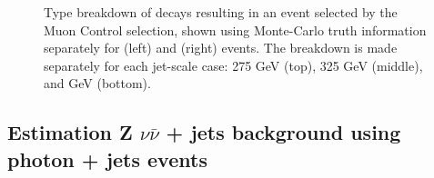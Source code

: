 \begin{figure}[h]
\begin{center}
\newline
{}

\caption{\label{fig:muon_types} Type breakdown of decays resulting in an event selected by the Muon Control selection, shown using Monte-Carlo truth information separately for \ttj (left) and \wj (right) events. The breakdown is made separately for each jet-scale case: 275 \less \HT {} GeV (top), 325 \less \HT {} GeV (middle), and \HT {} GeV (bottom). }
\end{center}
\end{figure}

\subsection{Estimation Z  $\nu \bar{\nu}$ + jets background using photon + jets events}

